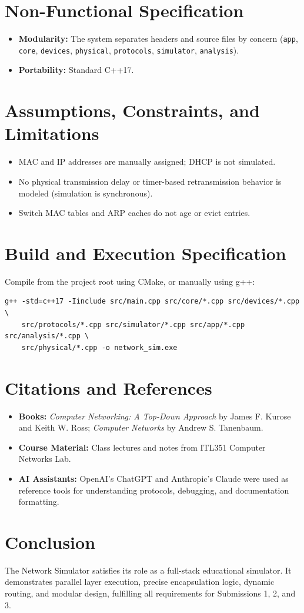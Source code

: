\documentclass[12pt,a4paper]{article}
\begin{document}
\section{Non-Functional Specification}
\begin{itemize}
    \item \textbf{Modularity:} The system separates headers and source files by concern (\texttt{app}, \texttt{core}, \texttt{devices}, \texttt{physical}, \texttt{protocols}, \texttt{simulator}, \texttt{analysis}).
    \item \textbf{Portability:} Standard C++17.
\end{itemize}

\section{Assumptions, Constraints, and Limitations}
\begin{itemize}
    \item MAC and IP addresses are manually assigned; DHCP is not simulated.
    \item No physical transmission delay or timer-based retransmission behavior is modeled (simulation is synchronous).
    \item Switch MAC tables and ARP caches do not age or evict entries.
\end{itemize}

\section{Build and Execution Specification}
Compile from the project root using CMake, or manually using g++:
\begin{verbatim}
g++ -std=c++17 -Iinclude src/main.cpp src/core/*.cpp src/devices/*.cpp \
    src/protocols/*.cpp src/simulator/*.cpp src/app/*.cpp src/analysis/*.cpp \
    src/physical/*.cpp -o network_sim.exe
\end{verbatim}

\section{Citations and References}
\begin{itemize}
    \item \textbf{Books:} \textit{Computer Networking: A Top-Down Approach} by James F. Kurose and Keith W. Ross; \textit{Computer Networks} by Andrew S. Tanenbaum.
    \item \textbf{Course Material:} Class lectures and notes from ITL351 Computer Networks Lab.
    \item \textbf{AI Assistants:} OpenAI's ChatGPT and Anthropic's Claude were used as reference tools for understanding protocols, debugging, and documentation formatting.
\end{itemize}

\section{Conclusion}
The Network Simulator satisfies its role as a full-stack educational simulator. It demonstrates parallel layer execution, precise encapsulation logic, dynamic routing, and modular design, fulfilling all requirements for Submissions 1, 2, and 3.
\end{document}
